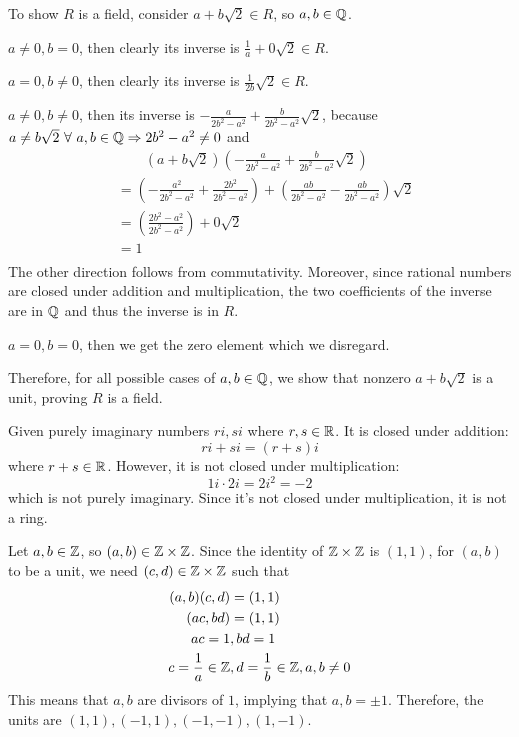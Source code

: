 \documentclass[12pt]{article}
\begin{document}
\begin{problem}[18.12]
To show $ R$ is a field, consider  $ a+b\sqrt{2} \in R $, so $ a,b \in \mathbb{Q}$.
\begin{case}[]
$a\neq 0, b=0$, then clearly its inverse is  $ \frac{1}{a}+0\sqrt{2} \in R $.
\end{case}
\begin{case}[]
$a=0, b\neq 0$, then clearly its inverse is $ \frac{1}{2b} \sqrt{2} \in R $.
\end{case}
\begin{case}[]
	$ a\neq 0, b\neq 0$, then its inverse is  $ -\frac{a}{2b^2-a^2}+\frac{b}{2b^2-a^2} \sqrt{2} $, because $ a\neq b\sqrt{2} \ \forall \ a,b \in \mathbb{Q} \Rightarrow 2b^2-a^2 \neq 0 $ and 
	\begin{align*}
		&\qquad (a+b\sqrt{2} )\left( -\frac{a}{2b^2-a^2}+\frac{b}{2b^2-a^2} \sqrt{2} \right) \\
		&=\left( -\frac{a^2}{2b^2-a^2} + \frac{2b^2}{2b^2-a^2} \right) +\left( \frac{ab}{2b^2-a^2} - \frac{ab}{2b^2-a^2}  \right)  \sqrt{2}   \\
		&= \left( \frac{2b^2-a^2}{2b^2-a^2 } \right) + 0 \sqrt{2}   \\
		&=  1\\
	\end{align*}
	The other direction follows from commutativity. Moreover, since rational numbers are closed under addition and multiplication, the two coefficients of the inverse are in $ \mathbb{Q}$ and thus the inverse is in $ R$.
\begin{case}[]
$ a=0, b=0$, then we get the zero element which we disregard.
\end{case}
Therefore, for all possible cases of $ a,b \in \mathbb{Q}$, we show that nonzero $ a+b\sqrt{2} $ is a unit, proving $ R$ is a field.
\end{case}
\end{problem}
\begin{problem}[18.13]
Given purely imaginary numbers $ ri,si$ where $ r,s \in \mathbb{R}$. It is closed under addition:
\[
	ri + si = (r+s) i
\] 
where $ r+s \in \mathbb{R}$. However, it is not closed under multiplication:
\[
1i \cdot 2i = 2i^2 = -2 
\]
which is not purely imaginary. Since it's not closed under multiplication, it is not a ring.
\end{problem}
\begin{problem}[18.15]
	Let $ a,b\in \mathbb{Z}$, so $ (a,b)\in \mathbb{Z}\times \mathbb{Z}$. Since the identity of $ \mathbb{Z}\times \mathbb{Z}$ is $ (1,1)$, for $ (a,b)$ to be a unit, we need  $ (c,d) \in \mathbb{Z}\times \mathbb{Z}$ such that 
	\begin{align*}
		(a,b)(c,d)&=(1,1)\\
		(ac,bd)&= (1,1) \\
		ac=1&,bd=1  \\
		c=\frac{1}{a} \in \mathbb{Z} &, d=\frac{1}{b} \in \mathbb{Z}, a,b\neq 0
	\end{align*}
	This means that $ a,b$ are divisors of  $ 1$, implying that $ a,b=\pm 1$. Therefore, the units are $(1,1),(-1,1),(-1,-1),(1,-1) $.
\end{problem}
\end{document}
